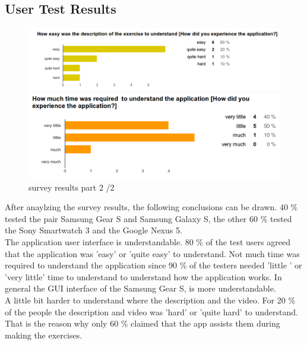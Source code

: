 \subsection{User Test Results}
\begin{figure}[b!]
  \centering
    \begin{minipage}{0.3\textwidth}
      \centering
        \includegraphics[width=1\textwidth]{00_resources/figures/survey_results4.png}
    \end{minipage}
    \begin{minipage}{0.3\textwidth}
      \centering
        \includegraphics[width=1\textwidth]{00_resources/figures/survey_results5.png}
    \end{minipage}
  \caption{survey results part 2 /2 }
  \label{fig:survey2}
\end{figure}
After anaylzing the survey results, the following conclusions can be drawn. 40 \% tested the pair Samsung Gear S and Samsung Galaxy S, the other 60 \% tested the Sony Smartwatch 3 and the Google Nexus 5.
\\
The application user interface is understandable. 80 \% of the test users agreed that the application was 'easy' or 'quite easy' to understand. Not much time was required to understand the application since 90 \% of the testers needed 'little ' or 'very little' time to understand to understand how the application works. In general the GUI interface of the Samsung Gear S, is more understandable.\\
A little bit harder to understand where the description and the video. For 20 \% of the people the description and video was 'hard' or 'quite hard' to understand. That is the reason why only 60 \% claimed that the app assists them during making the exercises.
